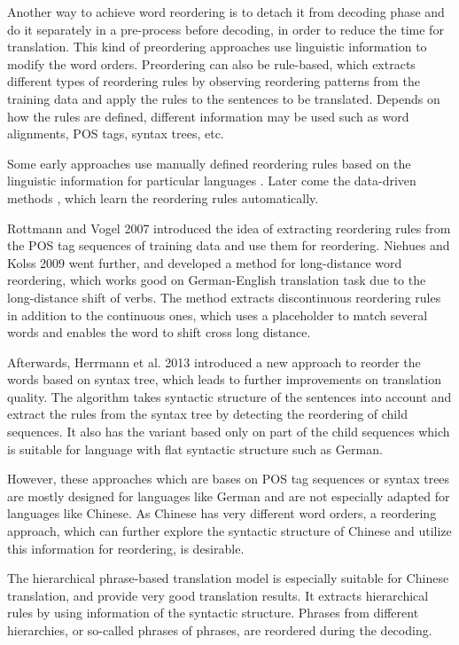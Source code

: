 \documentclass[a4paper]{article}
\begin{document}
Another way to achieve word reordering is to detach it from decoding phase and do it separately in a pre-process before decoding, in order to reduce the time for translation. This kind of preordering approaches use linguistic information to modify the word orders. Preordering can also be rule-based, which extracts different types of reordering rules by observing reordering patterns from the training data and apply the rules to the sentences to be translated. Depends on how the rules are defined, different information may be used such as word alignments, POS tags, syntax trees, etc.

Some early approaches use manually defined reordering rules based on the linguistic information for particular languages \cite{collins2005clause, popovic2006pos,habash2007syntactic,syntactic}. Later come the data-driven methods \cite{zhang2007chunk, crego2008using}, which learn the reordering rules automatically. 

Rottmann and Vogel 2007 \cite{short} introduced the idea of extracting reordering rules from the POS tag sequences of training data and use them for reordering. Niehues and Kolss 2009 \cite{long} went further, and developed a method for long-distance word reordering, which works good on German-English translation task due to the long-distance shift of verbs. The method extracts discontinuous reordering rules in addition to the continuous ones, which uses a placeholder to match several words and enables the word to shift cross long distance.

Afterwards, Herrmann et al. 2013 \cite{tree} introduced a new approach to reorder the words based on syntax tree, which leads to further improvements on translation quality. The algorithm takes syntactic structure of the sentences into account and extract the rules from the syntax tree by detecting the reordering of child sequences. It also has the variant based only on part of the child sequences which is suitable for language with flat syntactic structure such as German.

However, these approaches which are bases on POS tag sequences or syntax trees are mostly designed for languages like German and are not especially adapted for languages like Chinese. As Chinese has very different word orders, a reordering approach, which can further explore the syntactic structure of Chinese and utilize this information for reordering, is desirable.

The hierarchical phrase-based translation model \cite{hier} is especially suitable for Chinese translation, and provide very good translation results. It extracts hierarchical rules by using information of the syntactic structure. Phrases from different hierarchies, or so-called phrases of phrases, are reordered during the decoding. 
\end{document}
